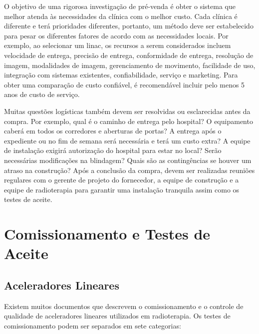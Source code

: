 \documentclass[11pt,a4paper]{article}
\newcounter{exemplo}
\begin{document}
	O objetivo de uma rigorosa investigação de pré-venda é obter o sistema que melhor atenda às necessidades da clínica com o melhor custo. Cada clínica é diferente e terá prioridades diferentes, portanto, um método deve ser estabelecido para pesar os diferentes fatores de acordo com as necessidades locais. Por exemplo, ao selecionar um linac, os recursos a serem considerados incluem velocidade de entrega, precisão de entrega, conformidade de entrega, resolução de imagem, modalidades de imagem, gerenciamento de movimento, facilidade de uso, integração com sistemas existentes, confiabilidade, serviço e marketing. Para obter uma comparação de custo confiável, é recomendável incluir pelo menos 5 anos de custo de serviço.

	Muitas questões logísticas também devem ser resolvidas ou esclarecidas antes da compra. Por exemplo, qual é o caminho de entrega pelo hospital? O equipamento caberá em todos os corredores e aberturas de portas? A entrega após o expediente ou no fim de semana será necessária e terá um custo extra? A equipe de instalação exigirá autorização do hospital para estar no local? Serão necessárias modificações na blindagem? Quais são as contingências se houver um atraso na construção? Após a conclusão da compra, devem ser realizadas reuniões regulares com o gerente de projeto do fornecedor, a equipe de construção e a equipe de radioterapia para garantir uma instalação tranquila assim como os testes de aceite.

\section{Comissionamento e Testes de Aceite}

\subsection*{Aceleradores Lineares}

	Existem muitos documentos que descrevem o comissionamento e o controle de qualidade de aceleradores lineares utilizados em radioterapia. Os testes de comissionamento podem ser separados em sete categorias:
\end{document}
